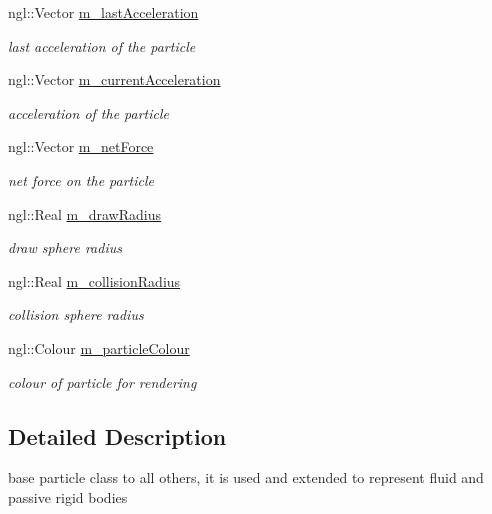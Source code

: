 \begin{DoxyCompactItemize}
ngl::Vector \hyperlink{class_particle_a352c3a71df0b2dc011808e8fc0ace062}{m\_\-lastAcceleration}
\begin{DoxyCompactList}\small\item\em last acceleration of the particle \item\end{DoxyCompactList}\item 
ngl::Vector \hyperlink{class_particle_adc620b3f6a45d397f0a674eef75cee84}{m\_\-currentAcceleration}
\begin{DoxyCompactList}\small\item\em acceleration of the particle \item\end{DoxyCompactList}\item 
ngl::Vector \hyperlink{class_particle_ad328d5b0f44818766286c928e436d36c}{m\_\-netForce}
\begin{DoxyCompactList}\small\item\em net force on the particle \item\end{DoxyCompactList}\item 
ngl::Real \hyperlink{class_particle_a680993dfd34187f6fb392b54761b285d}{m\_\-drawRadius}
\begin{DoxyCompactList}\small\item\em draw sphere radius \item\end{DoxyCompactList}\item 
ngl::Real \hyperlink{class_particle_a8bbc5654eda48d6b06c8d768d52cd74b}{m\_\-collisionRadius}
\begin{DoxyCompactList}\small\item\em collision sphere radius \item\end{DoxyCompactList}\item 
ngl::Colour \hyperlink{class_particle_a8c2475846190984cc19c9b3b0b668870}{m\_\-particleColour}
\begin{DoxyCompactList}\small\item\em colour of particle for rendering \item\end{DoxyCompactList}\end{DoxyCompactItemize}


\subsection{Detailed Description}
base particle class to all others, it is used and extended to represent fluid and passive rigid bodies 

